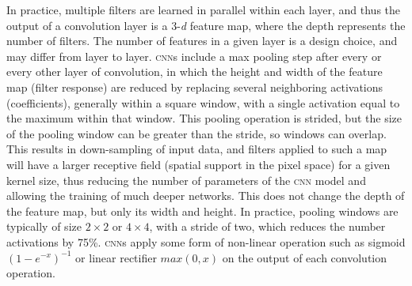 In practice, multiple filters are learned in parallel within each layer, and thus the output of a convolution layer is a 3-\textit{d} feature map, where the depth represents the number of filters. The number of features in a given layer is a design choice, and may differ from layer to layer.
\textsc{cnn}s include a max pooling \cite{xxx_lecun1995convolutional} step after every or every other layer of convolution, in which the height and width of the feature map (filter response) are reduced by replacing several neighboring activations (coefficients), generally within a square window, with a single activation equal to the maximum within that window.  This pooling operation is strided, but the size of the pooling window can be greater than the stride, so windows can overlap.
This results in down-sampling of input data, and filters applied to such a map will have a larger receptive field (spatial support in the pixel space) for a given kernel size, thus reducing the number of parameters of the \textsc{cnn} model and allowing the training of much deeper networks.
This does not change the depth of the feature map, but only its width and height.
In practice, pooling windows are typically of size $2 \times 2$ or $4 \times 4$, with a stride of two, which reduces the number activations by 75\%.
\textsc{cnn}s apply some form of non-linear operation such as sigmoid $ (1-e^{-x})^{-1} $ or linear rectifier $max(0,x)$ on the output of each convolution operation.


